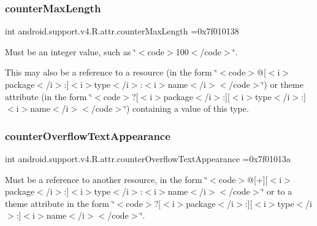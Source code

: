\subsubsection{\texorpdfstring{counter\+Max\+Length}{counterMaxLength}}
{\footnotesize\ttfamily int android.\+support.\+v4.\+R.\+attr.\+counter\+Max\+Length =0x7f010138\hspace{0.3cm}{\ttfamily [static]}}

Must be an integer value, such as \char`\"{}$<$code$>$100$<$/code$>$\char`\"{}. 

This may also be a reference to a resource (in the form \char`\"{}$<$code$>$@\mbox{[}$<$i$>$package$<$/i$>$\+:\mbox{]}$<$i$>$type$<$/i$>$\+:$<$i$>$name$<$/i$>$$<$/code$>$\char`\"{}) or theme attribute (in the form \char`\"{}$<$code$>$?\mbox{[}$<$i$>$package$<$/i$>$\+:\mbox{]}\mbox{[}$<$i$>$type$<$/i$>$\+:\mbox{]}$<$i$>$name$<$/i$>$$<$/code$>$\char`\"{}) containing a value of this type. \mbox{\label{classandroid_1_1support_1_1v4_1_1R_1_1attr_a63a591c6ef1d16eccb62ea244723d4a3}} 
\subsubsection{\texorpdfstring{counter\+Overflow\+Text\+Appearance}{counterOverflowTextAppearance}}
{\footnotesize\ttfamily int android.\+support.\+v4.\+R.\+attr.\+counter\+Overflow\+Text\+Appearance =0x7f01013a\hspace{0.3cm}{\ttfamily [static]}}

Must be a reference to another resource, in the form \char`\"{}$<$code$>$@\mbox{[}+\mbox{]}\mbox{[}$<$i$>$package$<$/i$>$\+:\mbox{]}$<$i$>$type$<$/i$>$\+:$<$i$>$name$<$/i$>$$<$/code$>$\char`\"{} or to a theme attribute in the form \char`\"{}$<$code$>$?\mbox{[}$<$i$>$package$<$/i$>$\+:\mbox{]}\mbox{[}$<$i$>$type$<$/i$>$\+:\mbox{]}$<$i$>$name$<$/i$>$$<$/code$>$\char`\"{}. \mbox{\label{classandroid_1_1support_1_1v4_1_1R_1_1attr_acb70339edeae49ae1b37939e05cf1d9a}} 
